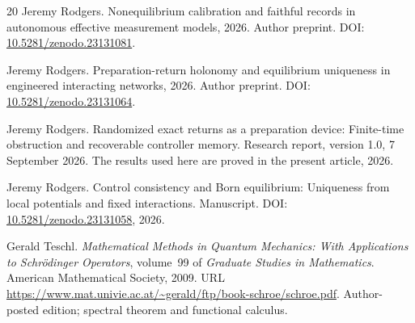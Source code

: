 \documentclass[11pt]{article}
\numberwithin{equation}{section}
\theoremstyle{definition}
\begin{document}
\begin{thebibliography}{20}
Jeremy Rodgers.
\newblock Nonequilibrium calibration and faithful records in autonomous
  effective measurement models, 2026{}.
\newblock Author preprint. DOI: \href{https://doi.org/10.5281/zenodo.23131081}{10.5281/zenodo.23131081}.

Jeremy Rodgers.
\newblock Preparation-return holonomy and equilibrium uniqueness in engineered
  interacting networks, 2026{}.
\newblock Author preprint. DOI: \href{https://doi.org/10.5281/zenodo.23131064}{10.5281/zenodo.23131064}.

Jeremy Rodgers.
\newblock Randomized exact returns as a preparation device: Finite-time
  obstruction and recoverable controller memory.
\newblock Research report, version 1.0, 7 September 2026. The results used here
  are proved in the present article, 2026{}.

Jeremy Rodgers.
\newblock Control consistency and {Born} equilibrium: Uniqueness from local
  potentials and fixed interactions.
\newblock Manuscript. DOI: \href{https://doi.org/10.5281/zenodo.23131058}{10.5281/zenodo.23131058},
  2026{}.

Gerald Teschl.
\newblock \emph{Mathematical Methods in Quantum Mechanics: With Applications to Schr{\"o}dinger Operators}, volume~99 of
  \emph{Graduate Studies in Mathematics}.
\newblock American Mathematical Society, 2009.
\newblock URL
  \url{https://www.mat.univie.ac.at/~gerald/ftp/book-schroe/schroe.pdf}.
\newblock Author-posted edition; spectral theorem and functional calculus.

\end{thebibliography}
\end{document}
